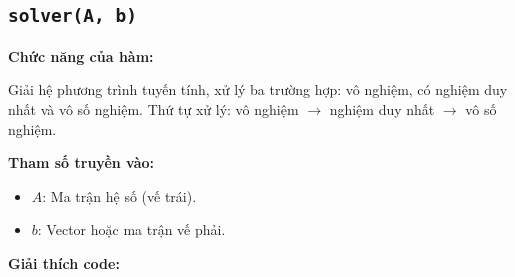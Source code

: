 \documentclass[a4paper,12pt]{report}
\begin{document}
\subsection[solver(A, b)]{\texttt{solver(A, b)}}

\textbf{Chức năng của hàm:}

Giải hệ phương trình tuyến tính, xử lý ba trường hợp: vô nghiệm, có nghiệm duy nhất và vô số nghiệm. Thứ tự xử lý: vô nghiệm $\rightarrow$ nghiệm duy nhất $\rightarrow$ vô số nghiệm.

\smallskip

\noindent\textbf{Tham số truyền vào:}
\begin{itemize}
    \item $A$: Ma trận hệ số (vế trái).
    \item $b$: Vector hoặc ma trận vế phải.
\end{itemize}

\smallskip

\noindent\textbf{Giải thích code:}
\end{document}
